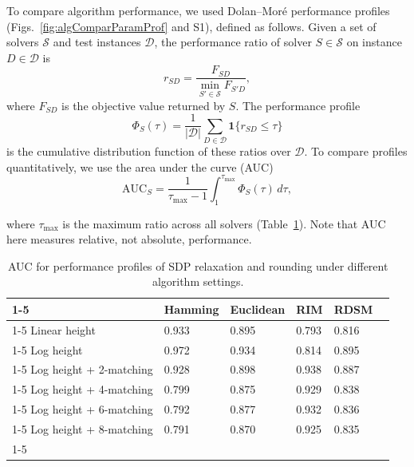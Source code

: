 \documentclass{article}
\begin{document}
To compare algorithm performance, we used Dolan--Moré
performance profiles \cite{dolan2002benchmarking}
(Figs.~\ref{fig:algComparParamProf} and S1), defined as
follows. Given a set of solvers $\mathcal{S}$ and test
instances $\mathcal{D}$, the performance ratio of solver
$S\in\mathcal{S}$ on instance $D\in\mathcal{D}$ is
\[
r_{SD}=\frac{F_{SD}}{\min_{S'\in\mathcal{S}} F_{S'D}},
\]
where $F_{SD}$ is the objective value returned by $S$.
The performance profile
\[
\Phi_S(\tau)=\frac{1}{|\mathcal{D}|}
\sum_{D\in\mathcal{D}} \mathbf{1}\{r_{SD}\le\tau\}
\]
is the cumulative distribution function of these ratios
over $\mathcal{D}$. To compare profiles quantitatively, we use the area under
the curve (AUC)
\begin{equation}
\text{AUC}_S=\frac{1}{\tau_{\max}-1}
\int_{1}^{\tau_{\max}} \Phi_S(\tau)\,d\tau,
\end{equation}

\noindent
where $\tau_{\max}$ is the maximum ratio across all
solvers (Table~\ref{table:AUC}). Note that AUC here measures relative, not absolute, performance.

\begin{table}[]
\begin{center}
\begin{tabular}{|l|l|l|l|l|l}
\cline{1-5}
& \textbf{Hamming} & \textbf{Euclidean} & \textbf{RIM} & \textbf{RDSM} &  \\ \cline{1-5}
Linear height & 0.933            & 0.895              & 0.793        & 0.816         &  \\ \cline{1-5}
Log height & 0.972            & 0.934              & 0.814        & 0.895         &  \\ \cline{1-5}
Log height + 2-matching & 0.928            & 0.898              & 0.938        & 0.887         &  \\ \cline{1-5}
Log height + 4-matching & 0.799            & 0.875              & 0.929        & 0.838         &  \\ \cline{1-5}
Log height + 6-matching & 0.792            & 0.877              & 0.932        & 0.836         &  \\ \cline{1-5}
Log height + 8-matching & 0.791            & 0.870              & 0.925        & 0.835         &  \\ \cline{1-5}
\end{tabular}\caption{AUC for performance profiles of SDP relaxation and rounding under different algorithm settings.}\label{table:AUC}
\end{center}
\end{table}
\end{document}

